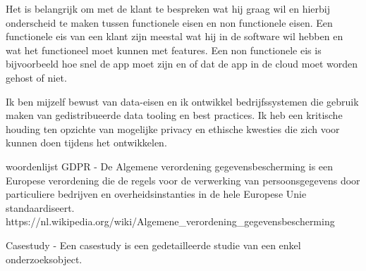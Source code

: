 Het is belangrijk om met de klant te bespreken wat hij graag wil en hierbij onderscheid te maken tussen functionele
eisen en non functionele eisen.
Een functionele eis van een klant zijn meestal wat hij in de software wil hebben en wat het functioneel moet kunnen met features.
Een non functionele eis is bijvoorbeeld hoe snel de app moet zijn en of dat de app in de cloud moet worden gehost of
niet.

Ik ben mijzelf bewust van data-eisen en ik ontwikkel bedrijfssystemen die gebruik maken van gedistribueerde
data tooling en best practices.
Ik heb een kritische houding ten opzichte van mogelijke privacy en ethische kwesties die zich voor kunnen doen
tijdens het ontwikkelen.




\newpage
\bigskip
\bigskip
woordenlijst
GDPR - De Algemene verordening gegevensbescherming is een Europese verordening die de regels voor de verwerking van
persoonsgegevens door particuliere bedrijven en overheidsinstanties in de hele Europese Unie standaardiseert.
https://nl.wikipedia.org/wiki/Algemene_verordening_gegevensbescherming

Casestudy -  Een casestudy is een gedetailleerde studie van een enkel onderzoeksobject.

